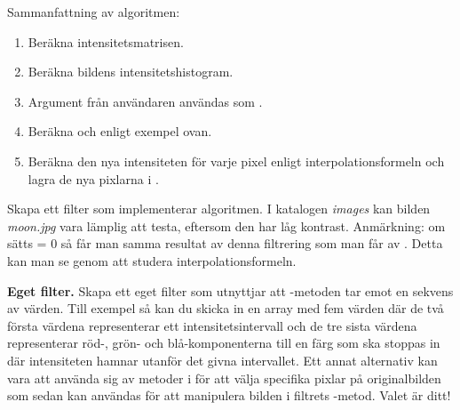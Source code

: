\vspace{1em}


\noindent Sammanfattning av algoritmen:
\begin{enumerate}
	\item Beräkna intensitetsmatrisen.
	\item Beräkna bildens intensitetshistogram.
	\item Argument från användaren användas som .
	\item Beräkna  och  enligt exempel ovan.
	\item Beräkna den nya intensiteten för varje pixel enligt interpolationsformeln och lagra de nya pixlarna i .
\end{enumerate}
Skapa ett filter  som implementerar algoritmen. I katalogen \emph{images} kan bilden \emph{moon.jpg} vara lämplig att testa, eftersom den har låg kontrast. Anmärkning: om  sätts = 0 så får man samma resultat av denna filtrering som man får av . Detta kan man se genom att studera interpolationsformeln.

\Task \textbf{Eget filter.} Skapa ett eget filter som utnyttjar att -metoden tar emot en sekvens av värden. Till exempel så kan du skicka in en array med fem värden där de två första värdena representerar ett intensitetsintervall och de tre sista värdena representerar röd-, grön- och blå-komponenterna till en färg som ska stoppas in där intensiteten hamnar utanför det givna intervallet. Ett annat alternativ kan vara att använda sig av metoder i  för att välja specifika pixlar på originalbilden som sedan kan användas för att manipulera bilden i filtrets -metod. Valet är ditt!
